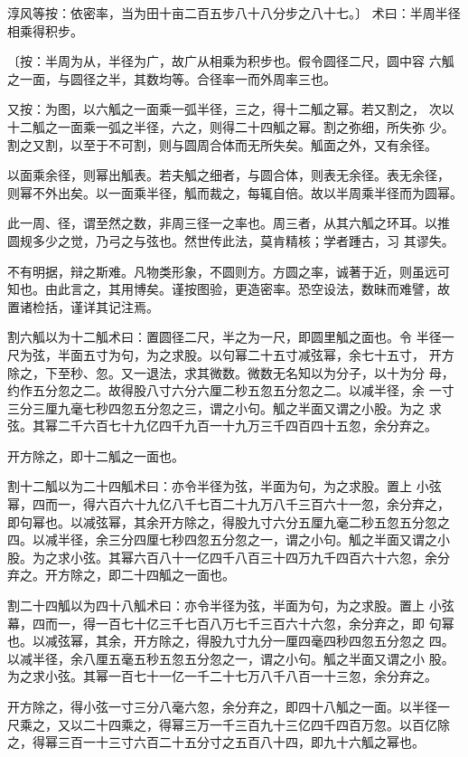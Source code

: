 \documentclass[a4paper,12pt,UTF8,twoside]{ctexbook}
\begin{document}
淳风等按：依密率，当为田十亩二百五步八十八分步之八十七。〕 术曰：半周半径相乘得积步。

〔按：半周为从，半径为广，故广从相乘为积步也。假令圆径二尺，圆中容 六觚之一面，与圆径之半，其数均等。合径率一而外周率三也。

又按：为图，以六觚之一面乘一弧半径，三之，得十二觚之幂。若又割之， 次以十二觚之一面乘一弧之半径，六之，则得二十四觚之幂。割之弥细，所失弥 少。割之又割，以至于不可割，则与圆周合体而无所失矣。觚面之外，又有余径。

以面乘余径，则幂出觚表。若夫觚之细者，与圆合体，则表无余径。表无余径， 则幂不外出矣。以一面乘半径，觚而裁之，每辄自倍。故以半周乘半径而为圆幂。

此一周、径，谓至然之数，非周三径一之率也。周三者，从其六觚之环耳。以推 圆规多少之觉，乃弓之与弦也。然世传此法，莫肯精核；学者踵古，习 其谬失。

不有明据，辩之斯难。凡物类形象，不圆则方。方圆之率，诚著于近，则虽远可 知也。由此言之，其用博矣。谨按图验，更造密率。恐空设法，数昧而难譬，故 置诸检括，谨详其记注焉。

割六觚以为十二觚术曰：置圆径二尺，半之为一尺，即圆里觚之面也。令 半径一尺为弦，半面五寸为句，为之求股。以句幂二十五寸减弦幂，余七十五寸， 开方除之，下至秒、忽。又一退法，求其微数。微数无名知以为分子，以十为分 母，约作五分忽之二。故得股八寸六分六厘二秒五忽五分忽之二。以减半径，余 一寸三分三厘九毫七秒四忽五分忽之三，谓之小句。觚之半面又谓之小股。为之 求弦。其幂二千六百七十九亿四千九百一十九万三千四百四十五忽，余分弃之。

开方除之，即十二觚之一面也。

割十二觚以为二十四觚术曰：亦令半径为弦，半面为句，为之求股。置上 小弦幂，四而一，得六百六十九亿八千七百二十九万八千三百六十一忽，余分弃之， 即句幂也。以减弦幂，其余开方除之，得股九寸六分五厘九毫二秒五忽五分忽之 四。以减半径，余三分四厘七秒四忽五分忽之一，谓之小句。觚之半面又谓之小 股。为之求小弦。其幂六百八十一亿四千八百三十四万九千四百六十六忽，余分 弃之。开方除之，即二十四觚之一面也。

割二十四觚以为四十八觚术曰：亦令半径为弦，半面为句，为之求股。置上 小弦幕，四而一，得一百七十亿三千七百八万七千三百六十六忽，余分弃之，即 句幂也。以减弦幂，其余，开方除之，得股九寸九分一厘四毫四秒四忽五分忽之 四。以减半径，余八厘五毫五秒五忽五分忽之一，谓之小句。觚之半面又谓之小 股。为之求小弦。其幂一百七十一亿一千二十七万八千八百一十三忽，余分弃之。

开方除之，得小弦一寸三分八毫六忽，余分弃之，即四十八觚之一面。以半径一 尺乘之，又以二十四乘之，得幂三万一千三百九十三亿四千四百万忽。以百亿除 之，得幂三百一十三寸六百二十五分寸之五百八十四，即九十六觚之幂也。
\end{document}
